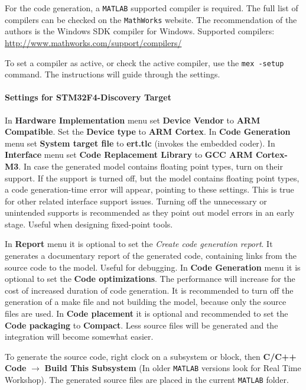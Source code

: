 For the code generation, a \verb!MATLAB! supported compiler is required. The full list of compilers can be checked on the \verb!MathWorks! website. The recommendation of the authors is the Windows SDK compiler for Windows.
Supported compilers: \href{http://www.mathworks.com/support/compilers/}{http://www.mathworks.com/support/compilers/}

To set a compiler as active, or check the active compiler, use the \verb!mex -setup! command. The instructions will guide through the settings.

\paragraph{Settings for STM32F4-Discovery Target}

In \textbf{Hardware Implementation} menu set \textbf{Device Vendor} to \textbf{ARM Compatible}. Set the \textbf{Device type} to \textbf{ARM Cortex}.
In \textbf{Code Generation} menu set \textbf{System target file} to \textbf{ert.tlc} (invokes the embedded coder).
In \textbf{Interface} menu set \textbf{Code Replacement Library} to \textbf{GCC ARM Cortex-M3}.
In case the generated model contains floating point types, turn on their support. If the support is turned off, but the model contains floating point types, a code generation-time error will appear, pointing to these settings. This is true for other related interface support issues. Turning off the unnecessary or unintended supports is recommended as they point out model errors in an early stage. Useful when designing fixed-point tools.

In \textbf{Report} menu it is optional to set the \emph{Create code generation report}.
It generates a documentary report of the generated code, containing links from the source code to the model. Useful for debugging.
In \textbf{Code Generation} menu it is optional to set the \textbf{Code optimizations}.
The performance will increase for the cost of increased duration of code generation. It is recommended to turn off the generation of a make file and not building the model, because only the source files are used.
In \textbf{Code placement} it is optional and recommended to set the \textbf{Code packaging} to \textbf{Compact}. Less source files will be generated and the integration will become somewhat easier.

To generate the source code, right clock on a subsystem or block, then \textbf{C/C++ Code} $\rightarrow$ \textbf{Build This Subsystem} (In older \verb!MATLAB! versions look for Real Time Workshop). The generated source files are placed in the current \verb!MATLAB! folder.

